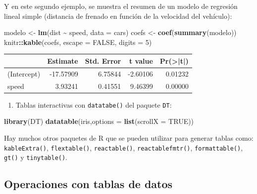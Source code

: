 \documentclass[
]{book}
\newenvironment{Shaded}{\begin{snugshade}}{\end{snugshade}}
\newcommand{\AttributeTok}[1]{\textcolor[rgb]{0.13,0.29,0.53}{#1}}
\newcommand{\ConstantTok}[1]{\textcolor[rgb]{0.56,0.35,0.01}{#1}}
\newcommand{\DecValTok}[1]{\textcolor[rgb]{0.00,0.00,0.81}{#1}}
\newcommand{\FunctionTok}[1]{\textcolor[rgb]{0.13,0.29,0.53}{\textbf{#1}}}
\newcommand{\NormalTok}[1]{#1}
\newcommand{\OtherTok}[1]{\textcolor[rgb]{0.56,0.35,0.01}{#1}}
\newcommand{\SpecialCharTok}[1]{\textcolor[rgb]{0.81,0.36,0.00}{\textbf{#1}}}
\providecommand{\tightlist}{%
  \setlength{\itemsep}{0pt}\setlength{\parskip}{0pt}}
\begin{document}
Y en este segundo ejemplo, se muestra el resumen de un modelo de regresión lineal simple (distancia de frenado en función de la velocidad del vehículo):

\begin{Shaded}
\begin{Highlighting}[]
\NormalTok{modelo }\OtherTok{\textless{}{-}} \FunctionTok{lm}\NormalTok{(dist }\SpecialCharTok{\textasciitilde{}}\NormalTok{ speed, }\AttributeTok{data =}\NormalTok{ cars)}
\NormalTok{coefs }\OtherTok{\textless{}{-}} \FunctionTok{coef}\NormalTok{(}\FunctionTok{summary}\NormalTok{(modelo))}
\NormalTok{knitr}\SpecialCharTok{::}\FunctionTok{kable}\NormalTok{(coefs, }\AttributeTok{escape =} \ConstantTok{FALSE}\NormalTok{, }\AttributeTok{digits =} \DecValTok{5}\NormalTok{)}
\end{Highlighting}
\end{Shaded}

\begin{tabular}{l|r|r|r|r}
\hline
  & Estimate & Std. Error & t value & Pr(>|t|)\\
\hline
(Intercept) & -17.57909 & 6.75844 & -2.60106 & 0.01232\\
\hline
speed & 3.93241 & 0.41551 & 9.46399 & 0.00000\\
\hline
\end{tabular}

\begin{enumerate}
\def\labelenumi{\alph{enumi}.}
\setcounter{enumi}{1}
\tightlist
\item
  Tablas interactivas con \texttt{datatabe()} del paquete \texttt{DT}:
\end{enumerate}

\begin{Shaded}
\begin{Highlighting}[]
\FunctionTok{library}\NormalTok{(DT)}
\FunctionTok{datatable}\NormalTok{(iris,}\AttributeTok{options =} \FunctionTok{list}\NormalTok{(}\AttributeTok{scrollX =} \ConstantTok{TRUE}\NormalTok{))}
\end{Highlighting}
\end{Shaded}

Hay muchos otros paquetes de R que se pueden utilizar para generar tablas como:
\texttt{kableExtra()}, \texttt{flextable()}, \texttt{reactable()}, \texttt{reactablefmtr()},
\texttt{formattable()}, \texttt{gt()} y \texttt{tinytable()}.

\hypertarget{operaciones-con-tablas-de-datos}{%
\subsection{Operaciones con tablas de datos}\label{operaciones-con-tablas-de-datos}}
\end{document}

